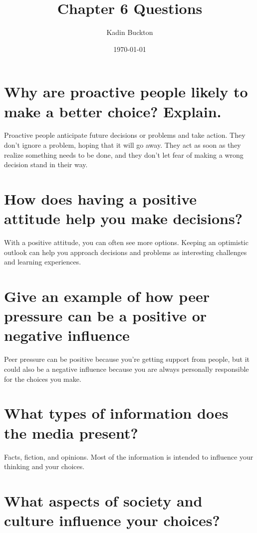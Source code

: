 \documentclass[11pt]{article}
\author{Kadin Buckton}
\date{\today}
\title{Chapter 6 Questions}
\begin{document}
\maketitle

\section*{Why are proactive people likely to make a better choice? Explain.}
\label{sec:orgc99be2d}

Proactive people anticipate future decisions or problems and take action. They don't ignore a problem, hoping that it will go away. They act as soon as they realize something needs to be done, and they don't let fear of making a wrong decision stand in their way.

\section*{How does having a positive attitude help you make decisions?}
\label{sec:org2bab047}

With a positive attitude, you can often see more options. Keeping an optimistic outlook can help you approach decisions and problems as interesting challenges and learning experiences.

\section*{Give an example of how peer pressure can be a positive or negative influence}
\label{sec:org781c004}

Peer pressure can be positive because you're getting support from people, but it could also be a negative influence because you are always personally responsible for the choices you make.

\section*{What types of information does the media present?}
\label{sec:org04df530}

Facts, fiction, and opinions. Most of the information is intended to influence your thinking and your choices.

\section*{What aspects of society and culture influence your choices?}
\label{sec:orgebd3e1c}
\end{document}
